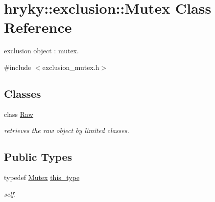 \hypertarget{classhryky_1_1exclusion_1_1_mutex}{\section{hryky\-:\-:exclusion\-:\-:Mutex Class Reference}
\label{classhryky_1_1exclusion_1_1_mutex}
}


exclusion object \-: mutex.  




{\ttfamily \#include $<$exclusion\-\_\-mutex.\-h$>$}

\subsection*{Classes}
\begin{DoxyCompactItemize}
\item 
class \hyperlink{classhryky_1_1exclusion_1_1_mutex_1_1_raw}{Raw}
\begin{DoxyCompactList}\small\item\em retrieves the raw object by limited classes. \end{DoxyCompactList}\end{DoxyCompactItemize}
\subsection*{Public Types}
\begin{DoxyCompactItemize}
\item 
\hypertarget{classhryky_1_1exclusion_1_1_mutex_adabc1c45a533006a1d21b671207415ad}{typedef \hyperlink{classhryky_1_1exclusion_1_1_mutex}{Mutex} \hyperlink{classhryky_1_1exclusion_1_1_mutex_adabc1c45a533006a1d21b671207415ad}{this\-\_\-type}}\label{classhryky_1_1exclusion_1_1_mutex_adabc1c45a533006a1d21b671207415ad}

\begin{DoxyCompactList}\small\item\em self. \end{DoxyCompactList}\end{DoxyCompactItemize}
